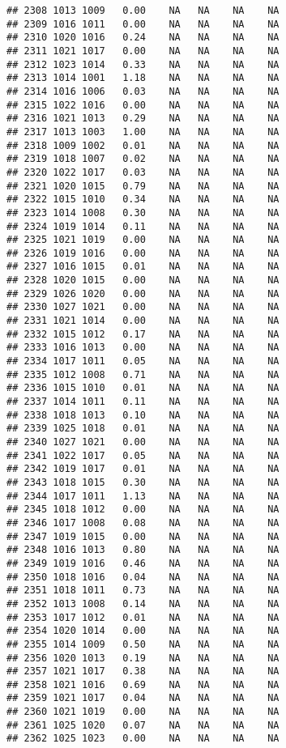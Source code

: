 \documentclass{article}\usepackage{graphicx, color}
\makeatletter
\newenvironment{kframe}{%
 \def\at@end@of@kframe{}%
 \ifinner\ifhmode%
  \def\at@end@of@kframe{\end{minipage}}%
  \begin{minipage}{\columnwidth}%
 \fi\fi%
 \def\FrameCommand##1{\hskip\@totalleftmargin \hskip-\fboxsep
 \colorbox{shadecolor}{##1}\hskip-\fboxsep
     \hskip-\linewidth \hskip-\@totalleftmargin \hskip\columnwidth}%
 \MakeFramed {\advance\hsize-\width
   \@totalleftmargin\z@ \linewidth\hsize
   \@setminipage}}%
 {\par\unskip\endMakeFramed%
 \at@end@of@kframe}
\newenvironment{knitrout}{}{} %
\makeatother
\begin{document}
\begin{knitrout}
\begin{kframe}
\begin{verbatim}
## 2308 1013 1009   0.00    NA   NA    NA    NA
## 2309 1016 1011   0.00    NA   NA    NA    NA
## 2310 1020 1016   0.24    NA   NA    NA    NA
## 2311 1021 1017   0.00    NA   NA    NA    NA
## 2312 1023 1014   0.33    NA   NA    NA    NA
## 2313 1014 1001   1.18    NA   NA    NA    NA
## 2314 1016 1006   0.03    NA   NA    NA    NA
## 2315 1022 1016   0.00    NA   NA    NA    NA
## 2316 1021 1013   0.29    NA   NA    NA    NA
## 2317 1013 1003   1.00    NA   NA    NA    NA
## 2318 1009 1002   0.01    NA   NA    NA    NA
## 2319 1018 1007   0.02    NA   NA    NA    NA
## 2320 1022 1017   0.03    NA   NA    NA    NA
## 2321 1020 1015   0.79    NA   NA    NA    NA
## 2322 1015 1010   0.34    NA   NA    NA    NA
## 2323 1014 1008   0.30    NA   NA    NA    NA
## 2324 1019 1014   0.11    NA   NA    NA    NA
## 2325 1021 1019   0.00    NA   NA    NA    NA
## 2326 1019 1016   0.00    NA   NA    NA    NA
## 2327 1016 1015   0.01    NA   NA    NA    NA
## 2328 1020 1015   0.00    NA   NA    NA    NA
## 2329 1026 1020   0.00    NA   NA    NA    NA
## 2330 1027 1021   0.00    NA   NA    NA    NA
## 2331 1021 1014   0.00    NA   NA    NA    NA
## 2332 1015 1012   0.17    NA   NA    NA    NA
## 2333 1016 1013   0.00    NA   NA    NA    NA
## 2334 1017 1011   0.05    NA   NA    NA    NA
## 2335 1012 1008   0.71    NA   NA    NA    NA
## 2336 1015 1010   0.01    NA   NA    NA    NA
## 2337 1014 1011   0.11    NA   NA    NA    NA
## 2338 1018 1013   0.10    NA   NA    NA    NA
## 2339 1025 1018   0.01    NA   NA    NA    NA
## 2340 1027 1021   0.00    NA   NA    NA    NA
## 2341 1022 1017   0.05    NA   NA    NA    NA
## 2342 1019 1017   0.01    NA   NA    NA    NA
## 2343 1018 1015   0.30    NA   NA    NA    NA
## 2344 1017 1011   1.13    NA   NA    NA    NA
## 2345 1018 1012   0.00    NA   NA    NA    NA
## 2346 1017 1008   0.08    NA   NA    NA    NA
## 2347 1019 1015   0.00    NA   NA    NA    NA
## 2348 1016 1013   0.80    NA   NA    NA    NA
## 2349 1019 1016   0.46    NA   NA    NA    NA
## 2350 1018 1016   0.04    NA   NA    NA    NA
## 2351 1018 1011   0.73    NA   NA    NA    NA
## 2352 1013 1008   0.14    NA   NA    NA    NA
## 2353 1017 1012   0.01    NA   NA    NA    NA
## 2354 1020 1014   0.00    NA   NA    NA    NA
## 2355 1014 1009   0.50    NA   NA    NA    NA
## 2356 1020 1013   0.19    NA   NA    NA    NA
## 2357 1021 1017   0.38    NA   NA    NA    NA
## 2358 1021 1016   0.69    NA   NA    NA    NA
## 2359 1021 1017   0.04    NA   NA    NA    NA
## 2360 1021 1019   0.00    NA   NA    NA    NA
## 2361 1025 1020   0.07    NA   NA    NA    NA
## 2362 1025 1023   0.00    NA   NA    NA    NA

\end{verbatim}
\end{kframe}
\end{knitrout}
\end{document}
